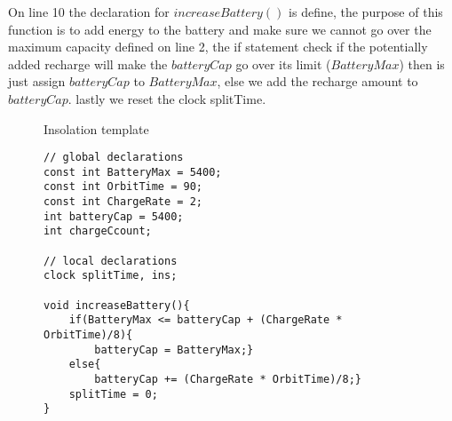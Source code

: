 On line 10 the declaration for $increaseBattery()$ is define, the purpose of this function is to add energy to the battery and make sure we cannot go over the maximum capacity defined on line 2, the if statement check if the potentially added recharge will make the $batteryCap$ go over its limit ($BatteryMax$) then is just assign $batteryCap$ to $BatteryMax$, else we add the recharge amount to $batteryCap$. lastly we reset the clock splitTime.

\begin{figure}[H]
	\centering
	\caption{Insolation template}
	\label{fig:cora_inso}
\end{figure}

\begin{figure}[H]
	\begin{lstlisting}[language=my_c, caption={Declarations and function}, label=lst:insolation_code]
// global declarations
const int BatteryMax = 5400;
const int OrbitTime = 90;
const int ChargeRate = 2;
int batteryCap = 5400;
int chargeCcount;

// local declarations
clock splitTime, ins;

void increaseBattery(){
	if(BatteryMax <= batteryCap + (ChargeRate * OrbitTime)/8){
		batteryCap = BatteryMax;}
	else{
		batteryCap += (ChargeRate * OrbitTime)/8;}
	splitTime = 0;
}
	\end{lstlisting}
\end{figure}

